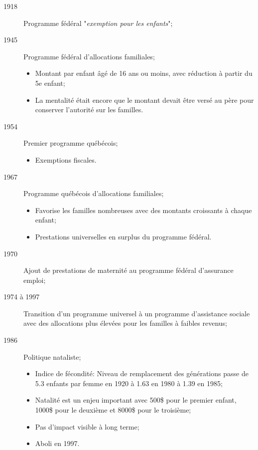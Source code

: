\documentclass[10pt, french]{article}
\begin{document}
\begin{multicols*}{3}
\begin{description}
	\item[1918]	Programme \textcolor{bulgarianrose}{fédéral} "\textit{exemption pour les enfants}";
	\item[1945]	Programme \textcolor{bulgarianrose}{fédéral} d'allocations familiales;
		\begin{itemize}[leftmargin = *]
		\item	Montant par enfant âgé de 16 ans ou moins, avec réduction à partir du 5e enfant;
		\item	La mentalité était encore que le montant devait être versé au père pour conserver l'autorité sur les familles.
		\end{itemize}
	\item[1954]	Premier programme \textcolor{blue(pigment)}{québécois};
		\begin{itemize}[leftmargin = *]
		\item	Exemptions fiscales.
		\end{itemize}
	\item[1967]	Programme \textcolor{blue(pigment)}{québécois} d'allocations familiales;
		\begin{itemize}[leftmargin = *]
		\item	Favorise les familles nombreuses avec des montants croissants à chaque enfant;
		\item	Prestations universelles en surplus du programme \textcolor{bulgarianrose}{fédéral}.
		\end{itemize}
	\item[1970]	Ajout de prestations de maternité au programme \textcolor{bulgarianrose}{fédéral} d'assurance emploi;
	\item[1974 à 1997]	Transition d'un programme universel à un programme d'assistance sociale avec des allocations plus élevées pour les familles à faibles revenus;
	\item[1986]	Politique nataliste;
		\begin{itemize}[leftmargin = *]
		\item	Indice de fécondité: Niveau de remplacement des générations passe de 5.3 enfants par femme en 1920 à 1.63 en 1980 à 1.39 en 1985;
		\item	Natalité est un enjeu important avec 500\$ pour le premier enfant, 1000\$ pour le deuxième et 8000\$ pour le troisième;
		\item	Pas d'impact visible à long terme;
		\item	Aboli en 1997.
		\end{itemize}

\end{description}
\end{multicols*}
\end{document}
